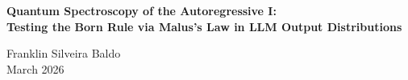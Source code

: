 \documentclass[12pt,a4paper]{article}
\begin{document}
\begin{center}
    {\LARGE\bfseries Quantum Spectroscopy of the Autoregressive I:\\[4pt]
    Testing the Born Rule via Malus's Law in LLM Output Distributions\\[4pt]}

    \vspace{0.5em}
    {\large Franklin Silveira Baldo}\\
    \vspace{0.5em}
    March 2026
\end{center}

\begin{abstract}
This paper tests whether sampling LLM outputs across simulated polarizer angles reproduces the $\cos^2\theta$ prediction of Malus's Law. The R\&G probe method treats the model's word-level binary output (transmitted/absorbed) as structurally isomorphic to photon counting. If the model's implicit physics encodes the Born rule, the output distribution across angles will follow $\cos^2\theta$. Deviations map the structure of the model's implicit quantum mechanics.
\end{abstract}

\end{document}
